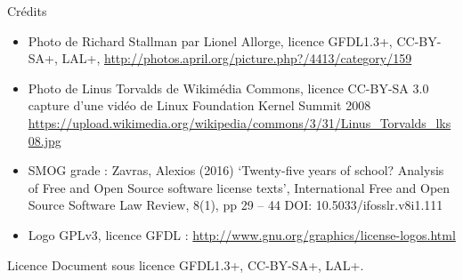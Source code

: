 \documentclass{beamer}
\begin{document}
\begin{frame}{Crédits}
  \begin{itemize}
  \item Photo de Richard Stallman par Lionel Allorge, licence GFDL1.3+, CC-BY-SA+, LAL+,  \url{http://photos.april.org/picture.php?/4413/category/159}
  \item Photo de Linus Torvalds de Wikimédia Commons, licence CC-BY-SA 3.0 capture d'une vidéo de Linux Foundation Kernel Summit 2008 \url{https://upload.wikimedia.org/wikipedia/commons/3/31/Linus_Torvalds_lks08.jpg}
\item SMOG grade : Zavras, Alexios (2016) ‘Twenty-five years of school? Analysis of Free and Open Source software license texts’, International Free and Open Source Software Law Review, 8(1),
pp 29 – 44 DOI: 10.5033/ifosslr.v8i1.111  
\item Logo GPLv3, licence GFDL : \url{http://www.gnu.org/graphics/license-logos.html}

  \end{itemize}
\end{frame}



\begin{frame}{Licence}
  Document sous licence GFDL1.3+, CC-BY-SA+, LAL+.
\end{frame}
\end{document}
